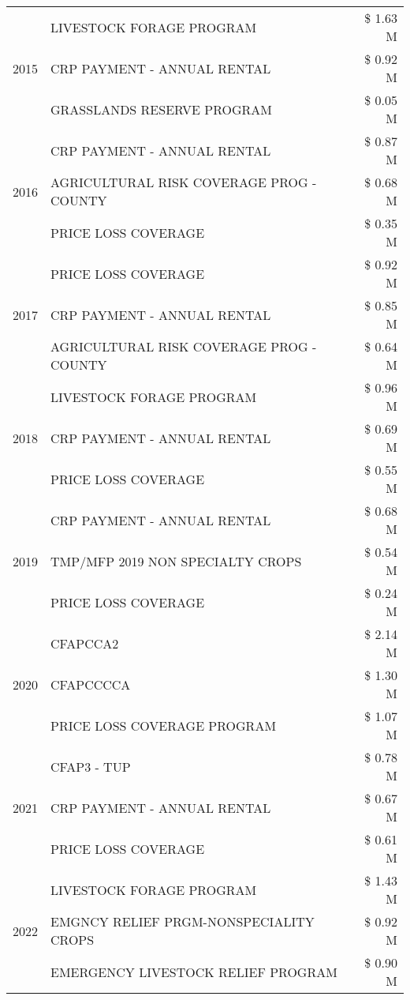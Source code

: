 \begin{tabular}{llr}
\cline{1-3}
\multirow[t]{3}{*}{2015} & LIVESTOCK FORAGE PROGRAM & \$ 1.63 M \\
 & CRP PAYMENT - ANNUAL RENTAL & \$ 0.92 M \\
 & GRASSLANDS RESERVE PROGRAM & \$ 0.05 M \\
\cline{1-3}
\multirow[t]{3}{*}{2016} & CRP PAYMENT - ANNUAL RENTAL & \$ 0.87 M \\
 & AGRICULTURAL RISK COVERAGE PROG - COUNTY & \$ 0.68 M \\
 & PRICE LOSS COVERAGE & \$ 0.35 M \\
\cline{1-3}
\multirow[t]{3}{*}{2017} & PRICE LOSS COVERAGE & \$ 0.92 M \\
 & CRP PAYMENT - ANNUAL RENTAL & \$ 0.85 M \\
 & AGRICULTURAL RISK COVERAGE PROG - COUNTY & \$ 0.64 M \\
\cline{1-3}
\multirow[t]{3}{*}{2018} & LIVESTOCK FORAGE PROGRAM & \$ 0.96 M \\
 & CRP PAYMENT - ANNUAL RENTAL & \$ 0.69 M \\
 & PRICE LOSS COVERAGE & \$ 0.55 M \\
\cline{1-3}
\multirow[t]{3}{*}{2019} & CRP PAYMENT - ANNUAL RENTAL & \$ 0.68 M \\
 & TMP/MFP 2019 NON SPECIALTY CROPS & \$ 0.54 M \\
 & PRICE LOSS COVERAGE & \$ 0.24 M \\
\cline{1-3}
\multirow[t]{3}{*}{2020} & CFAPCCA2 & \$ 2.14 M \\
 & CFAPCCCCA & \$ 1.30 M \\
 & PRICE LOSS COVERAGE PROGRAM & \$ 1.07 M \\
\cline{1-3}
\multirow[t]{3}{*}{2021} & CFAP3 - TUP & \$ 0.78 M \\
 & CRP PAYMENT - ANNUAL RENTAL & \$ 0.67 M \\
 & PRICE LOSS COVERAGE & \$ 0.61 M \\
\cline{1-3}
\multirow[t]{3}{*}{2022} & LIVESTOCK FORAGE PROGRAM & \$ 1.43 M \\
 & EMGNCY RELIEF PRGM-NONSPECIALITY CROPS & \$ 0.92 M \\
 & EMERGENCY LIVESTOCK RELIEF PROGRAM & \$ 0.90 M \\
\cline{1-3}
\bottomrule
\end{tabular}

